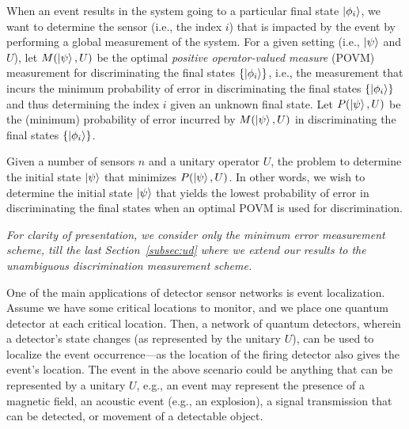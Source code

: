 When an event results in the system going to a particular final state $\ket{\phi_i}$, 
we want to determine the sensor (i.e., the index $i$) that is impacted by the event by performing a global measurement of the system. For a given setting (i.e.,  $\ket{\psi}$ and $U$), let 
$M(\ket{\psi}, U)$ be the optimal 
{\em positive operator-valued measure} (POVM) measurement for discriminating the
final states $\{\ket{\phi_i}\}$, i.e., 
the measurement that incurs the
minimum probability of error in 
discriminating the
final states $\{\ket{\phi_i}\}$ and thus
determining the index 
$i$ given an unknown final state.
Let $P(\ket{\psi}, U)$ be the (minimum) probability of error incurred by $M(\ket{\psi}, U)$ in discriminating the final states $\{\ket{\phi_i}\}$.

Given a number of sensors $n$ and a 
unitary operator $U$, 
the \iso problem to determine the 
initial state $\ket{\psi}$ that minimizes
$P(\ket{\psi}, U)$.
In other words, we wish to determine the initial state $\ket{\psi}$ 
that yields the lowest probability of error in discriminating the final states when
an optimal POVM is used for discrimination.

{\em For clarity of presentation, we consider only the minimum error measurement 
scheme, till the last Section~\ref{subsec:ud} where we extend our results to the unambiguous discrimination measurement scheme.}

One of the main applications of detector sensor networks is event localization. 
Assume we have some critical locations to monitor, and we place one quantum detector at each critical location.
Then, a network of quantum detectors, wherein a detector's
state changes (as represented by the unitary $U$), can be used to localize the event occurrence---as the location of the firing detector also gives the event's location. 
The event in the above scenario could be anything that can be represented by a unitary $U$, e.g., 
an event may represent the presence of a magnetic field, an acoustic event (e.g., an explosion), a signal transmission that can be detected, or movement of a detectable object.



